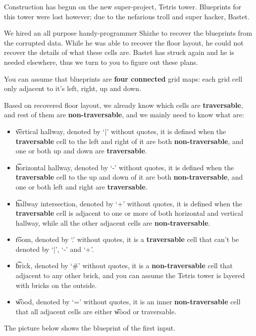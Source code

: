Construction has begun on the new super-project, Tetris tower. Blueprints for this tower were lost however;
due to the nefarious troll and super hacker, Bastet.

We hired an all purpose handy-programmer Shizhe to recover the blueprints from the corrupted data.
While he was able to recover the floor layout,
he could not recover the details of what these cells are.
Bastet has struck again and he is needed elsewhere, thus we turn to you to figure out these plans.

You can assume that blueprints are \textbf{four connected} grid maps:
each grid cell only adjacent to it's left, right, up and down. 

Based on recovered floor layout, 
we already know which cells are \textbf{traversable}, and rest of them are \textbf{non-traversable},
and we mainly need to know what are:
\begin{itemize}
  \item \t{vertical hallway}, denoted by \t{`|'} without quotes,
    it is defined when the \textbf{traversable} cell to the left and right of it are both \textbf{non-traversable},
    and one or both up and down are \textbf{traversable}.
  \item \t{horizontal hallway}, denoted by \t{`-'} without quotes,
    it is defined when the \textbf{traversable} cell to the up and down of it are both \textbf{non-traversable},
    and one or both left and right are \textbf{traversable}.
  \item \t{hallway intersection}, denoted by \t{`+'} without quotes,
    it is defined when the \textbf{traversable} cell is adjacent to one or more of both horizontal and vertical hallway,
    while all the other adjacent cells are \textbf{non-traversable}.
  \item \t{room}, denoted by \t{`.'} without quotes, it is a \textbf{traversable} cell that can't be denoted by \t{`|'}, \t{`-'} and \t{`+'}.
  \item \t{brick}, denoted by \t{`\#'} without quotes, it is a \textbf{non-traversable} cell that adjacent to any other brick,
    and you can assume the Tetris tower is layered with bricks on the outside.
  \item \t{wood}, denoted by \t{`='} without quotes, it is an inner \textbf{non-traversable} cell that 
    all adjacent cells are either \t{wood} or traversable.
\end{itemize}

The picture below shows the blueprint of the first input.

